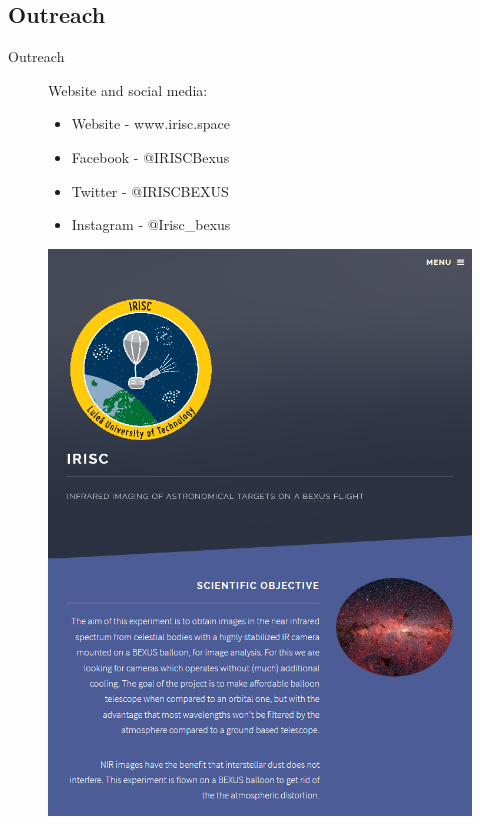 \documentclass[11pt, aspectratio=169]{beamer}
\begin{document}
{
\subsection{Outreach} 			%
\begin{frame}{Outreach}
\begin{figure}[!htb]
	\centering
    \begin{minipage}{0.5\textwidth}
    \vspace{-2cm}
    Website and social media:
    	\begin{itemize}
    		\item Website - www.irisc.space
    		\item Facebook - @IRISCBexus
    		\item Twitter - @IRISCBEXUS
    		\item Instagram - @Irisc\_bexus
    	\end{itemize}
    \end{minipage}%
    \begin{minipage}{.5\textwidth}
        \centering
        \includegraphics[width=0.9\linewidth]{figures/images/website.png}
    \end{minipage}%
\end{figure}
\end{frame}}
\end{document}
